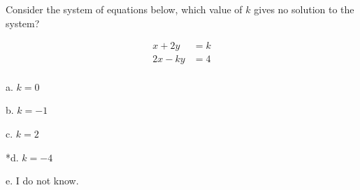 
Consider the system of equations below, which value of \( k \) gives no solution to the system? 

\begin{align*}
    x + 2y &= k \\
    2x - ky &= 4
\end{align*}\\



a. \( k = 0 \)

b. \( k = - 1 \)

c. \( k = 2 \)

*d. \( k = - 4 \)

e. I do not know.\\

